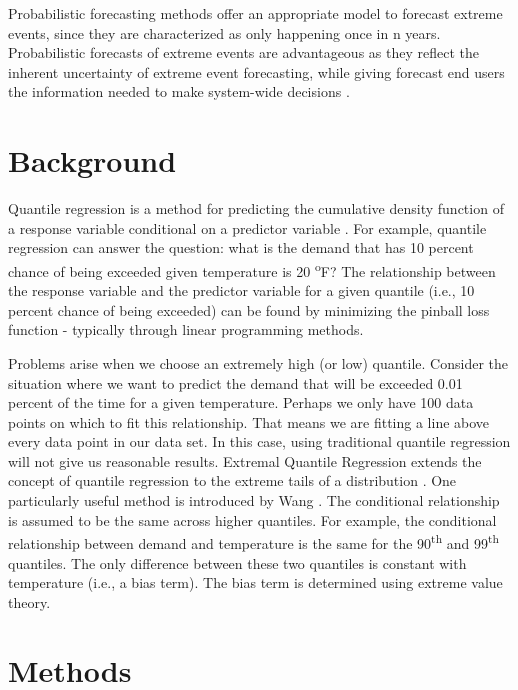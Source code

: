 \documentclass{article}
\begin{document}
Probabilistic forecasting methods offer an appropriate model to forecast extreme events, since they are characterized as only happening once in n years. Probabilistic forecasts of extreme events are advantageous as they reflect the inherent uncertainty of extreme event forecasting, while giving forecast end users the information needed to make system-wide decisions \cite{murphy1991probabilities}.


\section{Background}

Quantile regression is a method for predicting the cumulative density function of a response variable conditional on a predictor variable \cite{koenker1978regression}. For example, quantile regression can answer the question: what is the demand that has 10 percent chance of being exceeded given temperature is 20 \textsuperscript{o}F? The relationship between the response variable and the predictor variable for a given quantile (i.e., 10 percent chance of being exceeded) can be found by minimizing the pinball loss function - typically through linear programming methods.

Problems arise when we choose an extremely high (or low) quantile. Consider the situation where we want to predict the demand that will be exceeded 0.01 percent of the time for a given temperature. Perhaps we only have 100 data points on which to fit this relationship. That means we are fitting a line above every data point in our data set. In this case, using traditional quantile regression will not give us reasonable results. Extremal Quantile Regression extends the concept of quantile regression to the extreme tails of a distribution \cite{chernozhukov2005extremal}. One particularly useful method is introduced by Wang \cite{wang2012estimation}. The conditional relationship is assumed to be the same across higher quantiles. For example, the conditional relationship between demand and temperature is the same for the 90\textsuperscript{th} and 99\textsuperscript{th} quantiles. The only difference between these two quantiles is constant with temperature (i.e., a bias term). The bias term is determined using extreme value theory.

\section{Methods}
\end{document}
